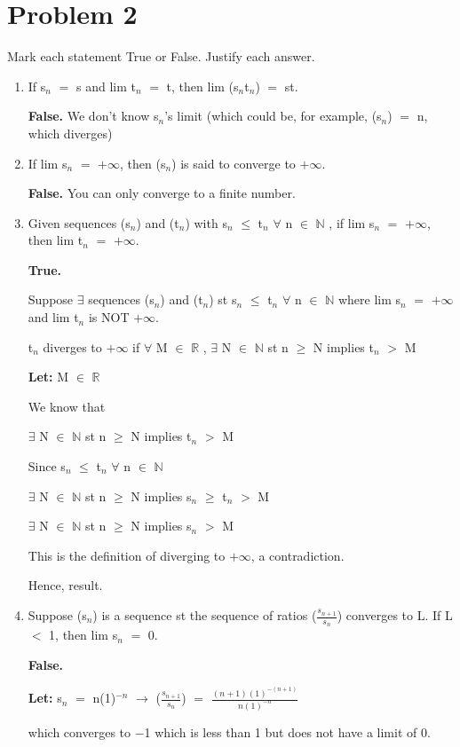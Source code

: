 \documentclass{article}
\newcommand{\mt}[1]{\ensuremath{#1}}
\newcommand\bsc[2][\DefaultOpt]{%
  \def\DefaultOpt{#2}%
  \section[#1]{#2}%
}
\newcommand{\balist}{\begin{enumerate}[label=\alph*.]}
\newcommand{\elist}{\end{enumerate}}
\newcommand{\lt}[1]{\textbf{Let: } #1}
\newcommand{\br}{\mt{\mathbb{R}} }       %
\newcommand{\bn}{\mt{\mathbb{N}} }       %
\newcommand{\fa}{\mt{\forall} }          %
\newcommand{\mem}{\mt{\in} }
\newcommand{\exs}{\mt{\exists} }
\newcommand{\lra}{ \mt{\longrightarrow} } %
\newcommand{\prn}[1]{(#1)}
\newcommand{\ps}{\mt{+} }
\newcommand{\ls}{\mt{<} }
\newcommand{\gr}{\mt{>} }
\newcommand{\lse}{\mt{\leq} }
\newcommand{\gre}{\mt{\geq} }
\newcommand{\eql}{\mt{=} }
\newcommand{\uw}[2]{#1\mt{_{#2}}}
\newcommand{\frc}[2]{\mt{\frac{#1}{#2}}}
\begin{document}
\bsc{Problem 2}{
Mark each statement True or False. Justify each answer.

\balist
\item If \uw{s}{n} \eql s and lim \uw{t}{n} \eql t, then lim (\uw{s}{n}\uw{t}{n}) \eql st.
	
	\textbf{False.} We don't know \uw{s}{n}'s limit (which could be, for example, (\uw{s}{n}) \eql n, which diverges)
\item If lim \uw{s}{n} \eql $+\infty$, then \prn{\uw{s}{n}} is said to converge to $+\infty$.
	
	\textbf{False.} You can only converge to a finite number.
\item Given sequences \prn{\uw{s}{n}} and \prn{\uw{t}{n}} with \uw{s}{n} \lse \uw{t}{n} \fa n \mem \bn, if lim \uw{s}{n} \eql $+\infty$, then lim \uw{t}{n} \eql $+\infty$.
	
	\textbf{True.} 
	
	Suppose \exs sequences \prn{\uw{s}{n}} and \prn{\uw{t}{n}} st \uw{s}{n} \lse \uw{t}{n} \fa n \mem \bn where lim \uw{s}{n} \eql $+\infty$ and  lim \uw{t}{n} is NOT $+\infty$.
	
	\uw{t}{n} diverges to $+\infty$ if \fa M \mem \br, \exs N \mem \bn st n \gre N implies \uw{t}{n} \gr M
	
	\lt{M \mem \br}
	
	We know that
	
	\exs N \mem \bn st n \gre N implies \uw{t}{n} \gr M
	
	Since \uw{s}{n} \lse \uw{t}{n} \fa n \mem \bn
	
	\exs N \mem \bn st n \gre N implies \uw{s}{n} \gre \uw{t}{n} \gr M
	
	\exs N \mem \bn st n \gre N implies \uw{s}{n} \gr M
	
	This is the definition of diverging to $+\infty$, a contradiction.
	
	Hence, result.
	
\newpage 

\item Suppose \prn{\uw{s}{n}} is a sequence st the sequence of ratios (\frc{\uw{s}{n \ps 1}}{\uw{s}{n}}) converges to L. If L \ls 1, then lim \uw{s}{n} \eql 0.
	
	\textbf{False.}
	
	\lt{\uw{s}{n} \eql n(1)$^{-n}$ \lra (\frc{\uw{s}{n \ps 1}}{\uw{s}{n}}) \eql $\frac{(n + 1)(1)^{-(n + 1)}}{n(1)^{-n}}$}
	
	which converges to $-$1 which is less than 1 but does not have a limit of 0. 
\elist
}
\end{document}
